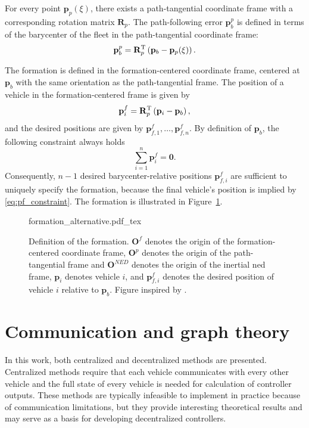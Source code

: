 For every point $\mathbf{p}_p(\xi)$, there exists a path-tangential coordinate frame with a corresponding rotation matrix $\mathbf{R}_p$. The path-following error $\mathbf{p}_b^p$ is defined in terms of the barycenter of the fleet in the path-tangential coordinate frame:
\begin{equation}\label{eq:barycenter_path_tangential}
    \mathbf{p}_b^p = \mathbf{R}_p^{\rm T}\left(\mathbf{p}_b - \mathbf{p}_p(\xi)\right).
\end{equation}

The formation is defined in the formation-centered coordinate frame, centered at $\mathbf{p}_b$ with the same orientation as the path-tangential frame. The position of a vehicle in the formation-centered frame is given by
\begin{equation}\label{eq:formation_centered_frame}
    \mathbf{p}_i^f = \mathbf{R}_p^{\rm T} \left(\mathbf{p}_i - \mathbf{p}_b \right),
\end{equation}
and the desired positions are given by $\mathbf{p}_{f,1}^f, \ldots, \mathbf{p}_{f,n}^f$. By definition of $\mathbf{p}_b$, the following constraint always holds
\begin{equation}\label{eq:pf_constraint}
    \sum_{i=1}^n \mathbf{p}_i^f = \mathbf{0}.
\end{equation} 
Consequently, $n-1$ desired barycenter-relative positions $\mathbf{p}_{f,i}^f$ are sufficient to uniquely specify the formation, because the final vehicle's position is implied by \eqref{eq:pf_constraint}. The formation is illustrated in Figure~\ref{fig:formation}. 


\begin{figure}[htp]
    \centering
    \def\svgwidth{\textwidth}
    {formation_alternative.pdf_tex}
    \caption{Definition of the formation. $\mathbf{O}^f$ denotes the origin of the formation-centered coordinate frame, $\mathbf{O}^p$ denotes the origin of the path-tangential frame and $\mathbf{O}^{NED}$ denotes the origin of the inertial \gls{ned} frame, $\mathbf{p}_i$ denotes vehicle $i$, and $\mathbf{p}_{f,i}^f$ denotes the desired position of vehicle $i$ relative to $\mathbf{p}_b$. Figure inspired by \cite{matous_singularity-free_2022}.}
    \label{fig:formation}
\end{figure}

\section{Communication and graph theory}\label{sec:graph_theory}
In this work, both centralized and decentralized methods are presented. Centralized methods require that each vehicle communicates with every other vehicle and the full state of every vehicle is needed for calculation of controller outputs. These methods are typically infeasible to implement in practice because of communication limitations, but they provide interesting theoretical results and may serve as a basis for developing decentralized controllers.

